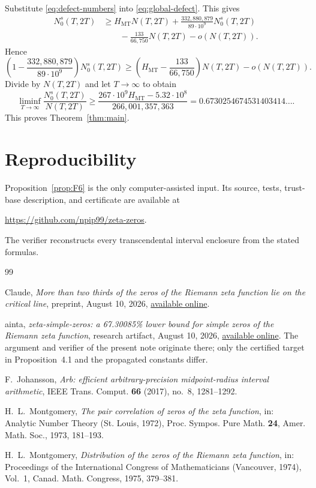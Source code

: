\documentclass[11pt]{article}
\begin{document}
Substitute \eqref{eq:defect-numbers} into \eqref{eq:global-defect}.  This gives
\begin{align*}
 N_0^s(T,2T)
 &\ge H_{\mathrm{MT}}N(T,2T)
 +\frac{332{,}880{,}879}{89\cdot10^{9}}N_0^s(T,2T)\\
 &\qquad-\frac{133}{66{,}750}N(T,2T)-o(N(T,2T)).
\end{align*}
Hence
\[
 \left(1-\frac{332{,}880{,}879}{89\cdot10^{9}}\right)N_0^s(T,2T)
 \ge
 \left(H_{\mathrm{MT}}-\frac{133}{66{,}750}\right)N(T,2T)
 -o(N(T,2T)).
\]
Divide by $N(T,2T)$ and let $T\to\infty$ to obtain
\[
 \liminf_{T\to\infty}\frac{N_0^s(T,2T)}{N(T,2T)}
 \ge
 \frac{267\cdot10^{9}H_{\mathrm{MT}}-5.32\cdot10^{8}}{266{,}001{,}357{,}363}
 =0.6730254674531403414\ldots .
\]
This proves Theorem~\ref{thm:main}.

\section*{Reproducibility}

Proposition~\ref{prop:F6} is the only computer-assisted input.  Its source,
tests, trust-base description, and certificate are available at
\begin{center}
\url{https://github.com/npip99/zeta-zeros}.
\end{center}
The verifier reconstructs every transcendental interval enclosure from the
stated formulas.

\begin{thebibliography}{99}

Claude,
\emph{More than two thirds of the zeros of the Riemann zeta function lie on the critical line},
preprint, August 10, 2026,
\href{https://www-cdn.anthropic.com/564f962e60643842f5fcb4a17c9dbc8f608f1c37.pdf}
{available online}.

ainta,
\emph{zeta-simple-zeros: a 67.30085\% lower bound for simple zeros of the Riemann zeta function},
research artifact, August 10, 2026,
\href{https://github.com/ainta/zeta-simple-zeros}{available online}.
The argument and verifier of the present note originate there; only the
certified target in Proposition~4.1 and the propagated constants differ.

F.~Johansson,
\emph{Arb: efficient arbitrary-precision midpoint-radius interval arithmetic},
IEEE Trans. Comput. \textbf{66} (2017), no.~8, 1281--1292.

H.~L.~Montgomery,
\emph{The pair correlation of zeros of the zeta function},
in: Analytic Number Theory (St. Louis, 1972),
Proc. Sympos. Pure Math. \textbf{24}, Amer. Math. Soc., 1973, 181--193.

H.~L.~Montgomery,
\emph{Distribution of the zeros of the Riemann zeta function},
in: Proceedings of the International Congress of Mathematicians
(Vancouver, 1974), Vol.~1,
Canad. Math. Congress, 1975, 379--381.

\end{thebibliography}
\end{document}
